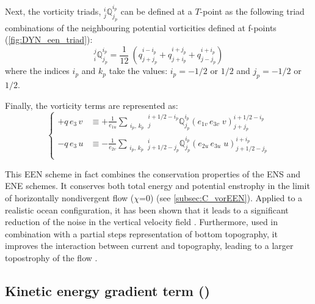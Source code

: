 \documentclass[../main/NEMO_manual]{subfiles}
\begin{document}
Next, the vorticity triads, $ {^i_j}\mathbb{Q}^{i_p}_{j_p}$ can be defined at a $T$-point as
the following triad combinations of the neighbouring potential vorticities defined at f-points
(\autoref{fig:DYN_een_triad}): 
\begin{equation}
  \label{eq:Q_triads}
  _i^j \mathbb{Q}^{i_p}_{j_p}
  = \frac{1}{12} \ \left(   q^{i-i_p}_{j+j_p} + q^{i+j_p}_{j+i_p} + q^{i+i_p}_{j-j_p}  \right)
\end{equation}
where the indices $i_p$ and $k_p$ take the values: $i_p = -1/2$ or $1/2$ and $j_p = -1/2$ or $1/2$. 

Finally, the vorticity terms are represented as: 
\begin{equation}
  \label{eq:dynvor_een}
  \left\{ {
      \begin{aligned}
        +q\,e_3 \, v 	&\equiv +\frac{1}{e_{1u} }   \sum_{\substack{i_p,\,k_p}}
        {^{i+1/2-i_p}_j}  \mathbb{Q}^{i_p}_{j_p}  \left( e_{1v}\,e_{3v} \;v  \right)^{i+1/2-i_p}_{j+j_p}   \\
        - q\,e_3 \, u     &\equiv -\frac{1}{e_{2v} }    \sum_{\substack{i_p,\,k_p}}
        {^i_{j+1/2-j_p}}  \mathbb{Q}^{i_p}_{j_p}  \left( e_{2u}\,e_{3u} \;u  \right)^{i+i_p}_{j+1/2-j_p}   \\
      \end{aligned}
    } \right.
\end{equation} 

This EEN scheme in fact combines the conservation properties of the ENS and ENE schemes.
It conserves both total energy and potential enstrophy in the limit of horizontally nondivergent flow
(\ie $\chi$=$0$) (see \autoref{subsec:C_vorEEN}). 
Applied to a realistic ocean configuration, it has been shown that it leads to a significant reduction of
the noise in the vertical velocity field \citep{Le_Sommer_al_OM09}.
Furthermore, used in combination with a partial steps representation of bottom topography,
it improves the interaction between current and topography,
leading to a larger topostrophy of the flow \citep{Barnier_al_OD06, Penduff_al_OS07}. 

\subsection{Kinetic energy gradient term (\protect{})}
\label{subsec:DYN_keg}
\end{document}
